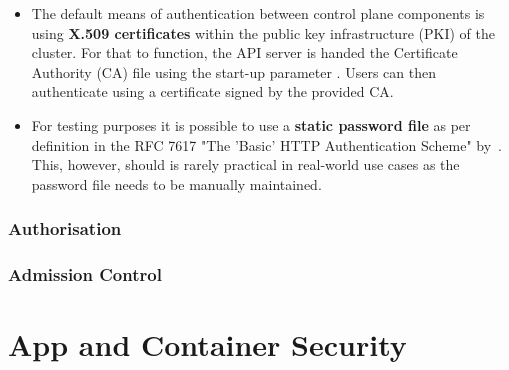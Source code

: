 \begin{itemize}
	\item The default means of authentication between control plane components is using \textbf{X.509 certificates} within the public key infrastructure (PKI) of the cluster. For that to function, the API server is handed the Certificate Authority (CA) file using the start-up parameter . Users can then authenticate using a certificate signed by the provided CA. %
	\item For testing purposes it is possible to use a \textbf{static password file} as per definition in the RFC 7617 "The 'Basic' HTTP Authentication Scheme" by~\cite{RFC7617}. This, however, should is rarely practical in real-world use cases as the password file needs to be manually maintained.
	
\end{itemize}

\subsubsection{Authorisation} \label{authorisation}


\subsubsection{Admission Control} \label{admissionControl}


\section{App and Container Security} \label{sec:layer4}

